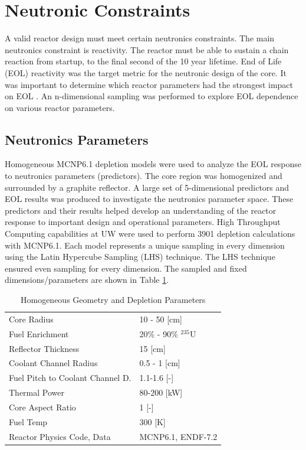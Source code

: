 \section{Neutronic Constraints} \label{neutronic_sweeps}

A valid reactor design must meet certain neutronics constraints. The main
neutronics constraint is reactivity. The reactor must be able to sustain a chain
reaction from startup, to the final second of the 10 year lifetime. End of Life
(EOL) reactivity was the target metric for the neutronic design of the core. It
was important to determine which reactor parameters had the strongest impact on
EOL \keff. An n-dimensional sampling was performed to explore EOL \keff
dependence on various reactor parameters.

\subsection{Neutronics Parameters}
Homogeneous MCNP6.1 depletion models were used to analyze the EOL \keff response
to neutronics parameters (predictors). The core region was homogenized and
surrounded by a graphite reflector. A large set of 5-dimensional predictors and
EOL \keff results was produced to investigate the neutronics parameter space.
These predictors and their results helped develop an understanding of the
reactor response to important design and operational parameters. High Throughput
Computing capabilities at UW were used to perform 3901 depletion calculations
with MCNP6.1. Each model represents a unique sampling in every dimension using
the Latin Hypercube Sampling (LHS) technique. The LHS technique ensured even
sampling for every dimension. The sampled and fixed dimensions/parameters are
shown in Table \ref{tab:lhs_sweep_vars}.

\begin{table}[h]
  \centering
  \caption{Homogeneous Geometry and Depletion Parameters}
  \begin{tabular}{ll}
    \toprule
     Core Radius                		   & 10 - 50 [cm] \\
     Fuel Enrichment 					   & 20\% - 90\% $^{235}$U\\
     Reflector Thickness				   & 15 [cm]\\
     Coolant Channel Radius                & 0.5 - 1 [cm] \\
     Fuel Pitch to Coolant Channel D.      & 1.1-1.6 [-]\\
     Thermal Power						   & 80-200 [kW]\\
     Core Aspect Ratio					   & 1 [-] \\
     Fuel Temp  						   & 300 [K]\\
     Reactor Physics Code, Data			   & MCNP6.1, ENDF-7.2
  \end{tabular}
  \label{tab:lhs_sweep_vars}
\end{table}

